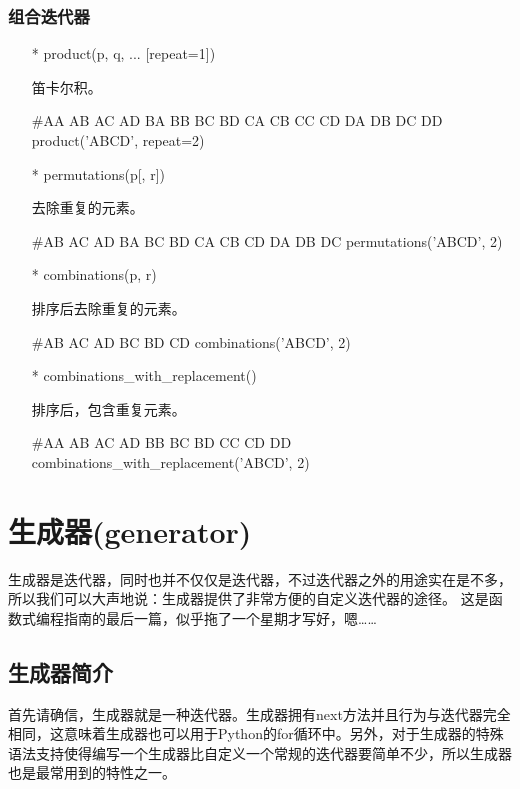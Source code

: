 \documentclass[12pt,a4paper]{report}
\begin{document}
\subsection{组合迭代器}
\begin{itemize}
    \item[*]product(p, q, ... [repeat=1])

    笛卡尔积。
    \begin{python}[moreemph={[4]42},caption={},label=ex1]
#AA AB AC AD BA BB BC BD CA CB CC CD DA DB DC DD
product('ABCD', repeat=2)
    \end{python}
    \item[*]permutations(p[, r])

    去除重复的元素。
    \begin{python}[moreemph={[4]42},caption={},label=ex1]
#AB AC AD BA BC BD CA CB CD DA DB DC
permutations('ABCD', 2)
    \end{python}
    \item[*]combinations(p, r)

    排序后去除重复的元素。
    \begin{python}[moreemph={[4]42},caption={},label=ex1]
#AB AC AD BC BD CD
combinations('ABCD', 2)
    \end{python}
    \item[*]combinations\_with\_replacement()

    排序后，包含重复元素。
    \begin{python}[moreemph={[4]42},caption={},label=ex1]
#AA AB AC AD BB BC BD CC CD DD
combinations\_with\_replacement('ABCD', 2)
    \end{python}
\end{itemize}
\chapter{生成器(generator)}
生成器是迭代器，同时也并不仅仅是迭代器，不过迭代器之外的用途实在是不多，所以我们可以大声地说：生成器提供了非常方便的自定义迭代器的途径。
这是函数式编程指南的最后一篇，似乎拖了一个星期才写好，嗯……

\section{生成器简介}
首先请确信，生成器就是一种迭代器。生成器拥有next方法并且行为与迭代器完全相同，这意味着生成器也可以用于Python的for循环中。另外，对于生成器的特殊语法支持使得编写一个生成器比自定义一个常规的迭代器要简单不少，所以生成器也是最常用到的特性之一。
\end{document}
